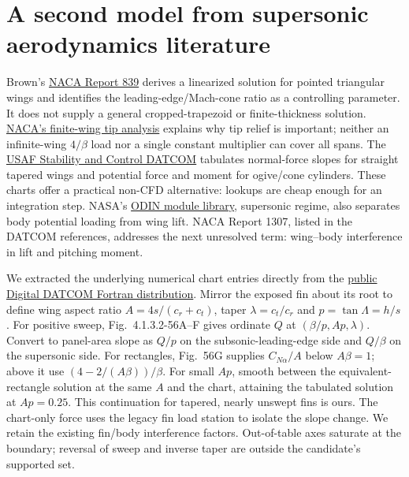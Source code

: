 \documentclass[10pt,letterpaper]{article}
\newcommand{\sub}[1]{\smallskip\noindent{\bfseries\color{navy}#1}\quad}
\begin{document}
\section{A second model from supersonic aerodynamics literature}
\sub{Why these methods.} Brown's \href{https://ntrs.nasa.gov/citations/19930090940}{NACA Report 839} derives a linearized solution for pointed triangular wings and identifies the leading-edge/Mach-cone ratio as a controlling parameter. It does not supply a general cropped-trapezoid or finite-thickness solution. \href{https://ntrs.nasa.gov/citations/19930082018}{NACA's finite-wing tip analysis} explains why tip relief is important; neither an infinite-wing $4/\beta$ load nor a single constant multiplier can cover all spans. The \href{https://www.pdas.com/datcomrefs.html}{USAF Stability and Control DATCOM} tabulates normal-force slopes for straight tapered wings and potential force and moment for ogive/cone cylinders. These charts offer a practical non-CFD alternative: lookups are cheap enough for an integration step. NASA's \href{https://ntrs.nasa.gov/citations/19780012225}{ODIN module library}, supersonic regime, also separates body potential loading from wing lift. NACA Report 1307, listed in the DATCOM references, addresses the next unresolved term: wing--body interference in lift and pitching moment.

\sub{Isolated wing force.} We extracted the underlying numerical chart entries directly from the \href{https://www.pdas.com/datcomdownload.html}{public Digital DATCOM Fortran distribution}. Mirror the exposed fin about its root to define wing aspect ratio $A=4s/(c_r+c_t)$, taper $\lambda=c_t/c_r$ and $p=\tan\Lambda=h/s$. For positive sweep, Fig.\ 4.1.3.2-56A--F gives ordinate $Q$ at $(\beta/p,Ap,\lambda)$. Convert to panel-area slope as $Q/p$ on the subsonic-leading-edge side and $Q/\beta$ on the supersonic side. For rectangles, Fig.\ 56G supplies $C_{N\alpha}/A$ below $A\beta=1$; above it use $(4-2/(A\beta))/\beta$. For small $Ap$, smooth between the equivalent-rectangle solution at the same $A$ and the chart, attaining the tabulated solution at $Ap=0.25$. This continuation for tapered, nearly unswept fins is ours. The chart-only force uses the legacy fin load station to isolate the slope change. We retain the existing fin/body interference factors. Out-of-table axes saturate at the boundary; reversal of sweep and inverse taper are outside the candidate's supported set.
\end{document}
